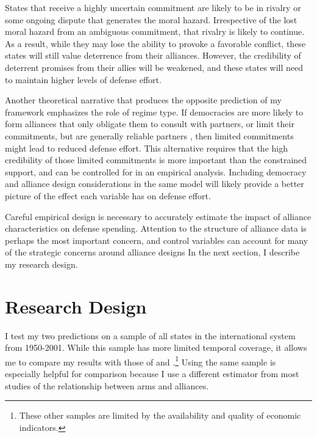 \documentclass[12pt]{article}
\begin{document}
States that receive a highly uncertain commitment are likely to be in rivalry or some ongoing dispute that generates the moral hazard. Irrespective of the lost moral hazard from an ambiguous commitment, that rivalry is likely to continue. As a result, while they may lose the ability to provoke a favorable conflict, these states will still value deterrence from their alliances. However, the credibility of deterrent promises from their allies will be weakened, and these states will need to maintain higher levels of defense effort.

Another theoretical narrative that produces the opposite prediction of my framework emphasizes the role of regime type. If democracies are more likely to form alliances that only obligate them to consult with partners, or limit their commitments, but are generally reliable partners \citep{Chibaetal2015, DigiuseppePoast2016}, then limited commitments might lead to reduced defense effort. This alternative requires that the high credibility of those limited commitments is more important than the constrained support, and can be controlled for in an empirical analysis. Including democracy and alliance design considerations in the same model will likely provide a better picture of the effect each variable has on defense effort. 

Careful empirical design is necessary to accurately estimate the impact of alliance characteristics on defense spending. Attention to the structure of alliance data is perhaps the most important concern, and control variables can account for many of the strategic concerns around alliance designs In the next section, I describe my research design. 
 

\section*{Research Design} 

I test my two predictions on a sample of all states in the international system from 1950-2001. While this sample has more limited temporal coverage, it allows me to compare my results with those of \citet{DigiuseppePoast2016} and \citet{Nordhausetal2012}.\footnote{These other samples are limited by the availability and quality of economic indicators.} Using the same sample is especially helpful for comparison because I use a different estimator from most studies of the relationship between arms and alliances. 
\end{document}
